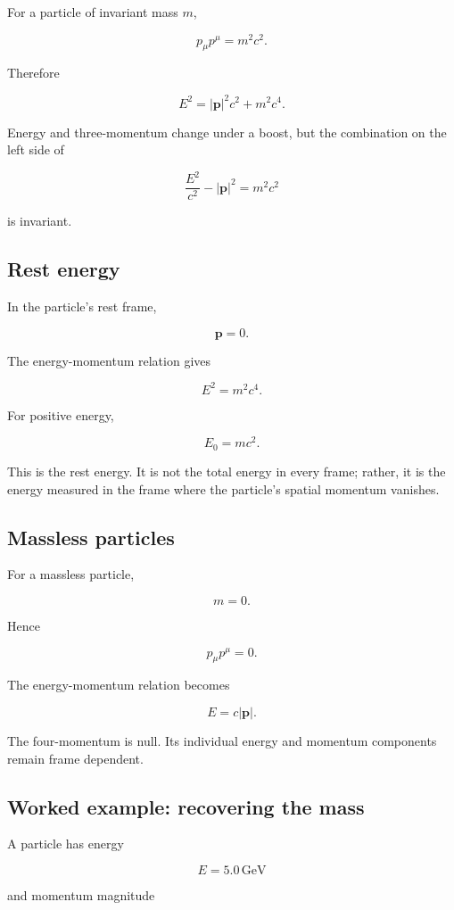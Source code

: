 For a particle of invariant mass \(m\),

\[
\boxed{
p_{\mu}p^{\mu}=m^{2}c^{2}
}.
\]

Therefore

\[
\boxed{
E^{2}
=
|\mathbf{p}|^{2}c^{2}
+
m^{2}c^{4}
}.
\]

Energy and three-momentum change under a boost, but the combination on the left side of

\[
\frac{E^{2}}{c^{2}}-|\mathbf{p}|^{2}
=
m^{2}c^{2}
\]

is invariant.

\subsection{Rest energy}

In the particle's rest frame,

\[
\mathbf{p}=0.
\]

The energy-momentum relation gives

\[
E^{2}=m^{2}c^{4}.
\]

For positive energy,

\[
\boxed{
E_{0}=mc^{2}
}.
\]

This is the rest energy. It is not the total energy in every frame; rather, it is the energy measured in the frame where the particle's spatial momentum vanishes.

\subsection{Massless particles}

For a massless particle,

\[
m=0.
\]

Hence

\[
\boxed{
p_{\mu}p^{\mu}=0
}.
\]

The energy-momentum relation becomes

\[
\boxed{
E=c|\mathbf{p}|
}.
\]

The four-momentum is null. Its individual energy and momentum components remain frame dependent.

\subsection{Worked example: recovering the mass}

A particle has energy

\[
E=5.0\,\mathrm{GeV}
\]

and momentum magnitude

